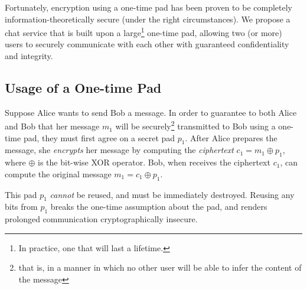 \documentclass[twocolumn]{article}
\begin{document}
Fortunately, encryption using a one-time pad has been proven to be completely information-theoretically secure (under the right circumstances). We propose a chat service that is built upon a large\footnote{
In practice, one that will last a lifetime.
}
one-time pad, allowing two (or more) users to securely communicate with each other with guaranteed confidentiality and integrity.

\subsection{Usage of a One-time Pad}
Suppose Alice wants to send Bob a message. In order to guarantee to both Alice and Bob that her message $m_1$ will be securely\footnote{
that is, in a manner in which no other user will be able to infer the content of the message
}
transmitted to Bob using a one-time pad, they must first agree on a secret pad $p_{1}$. After Alice prepares the message, she \emph{encrypts} her message by computing the \emph{ciphertext} $c_{1} = m_{1} \oplus p_{1}$, where $\oplus$ is the bit-wise XOR operator. Bob, when receives the ciphertext $c_1$, can compute the original message $m_1 = c_1 \oplus p_1$.

This pad $p_1$ \emph{cannot} be reused, and must be immediately destroyed. Reusing any bits from $p_1$ breaks the one-time assumption about the pad, and renders prolonged communication cryptographically insecure.
\end{document}
